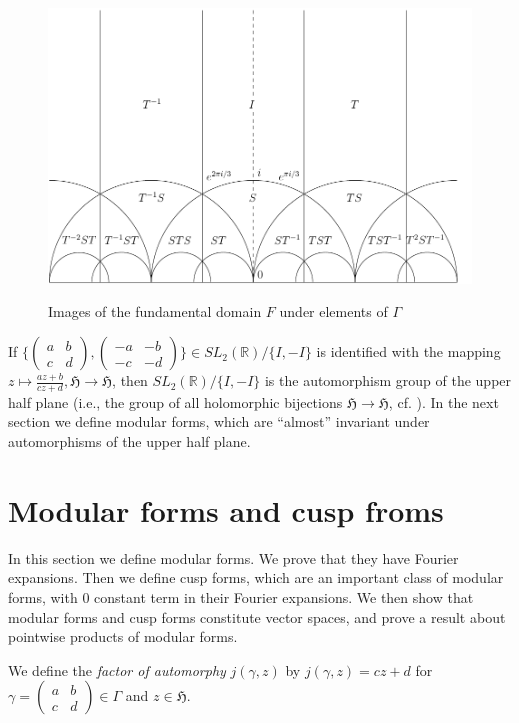 \documentclass{article}
\begin{document}
\begin{figure}
\caption{Images of the fundamental domain $F$ under elements of $\Gamma$}
\includegraphics[scale=0.75]{fundamental.pdf}
\label{figure:tiling}
\end{figure}

If 
$\{\begin{pmatrix}a&b\\c&d\end{pmatrix}, \begin{pmatrix}-a&-b\\-c&-d\end{pmatrix}\} \in SL_2(\mathbb{R})/\{I,-I\}$ is identified with the mapping $z \mapsto \frac{az+b}{cz+d}, \mathfrak{H} \to \mathfrak{H}$, then
$SL_2(\mathbb{R})/\{I,-I\}$ is the automorphism group of the upper half plane (i.e., the group of all holomorphic bijections $\mathfrak{H} \to \mathfrak{H}$, cf. \cite[Chapter VII, \S 3]{MR1659317}).
In the next section we define modular forms, which are ``almost'' invariant under automorphisms of the upper half plane.


\section{Modular forms and cusp froms}
In this section we define modular forms. We prove that they have Fourier expansions. Then we define cusp forms, which are
an important class of modular forms, with $0$ constant term in their Fourier expansions. We then show that
modular forms and cusp forms constitute vector spaces, and prove a result about pointwise products of modular forms. 

We define the {\em factor of automorphy} $j(\gamma,z)$ by
$j(\gamma,z)=cz+d$
for $\gamma=\begin{pmatrix}a&b\\c&d\end{pmatrix} \in \Gamma$
and
$z \in \mathfrak{H}$.
\end{document}
